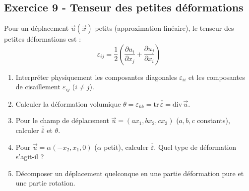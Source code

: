 \documentclass[12pt,a4paper]{article}
\begin{document}
\subsection*{Exercice 9 - Tenseur des petites déformations \niveau{\moyen}}

\begin{boiteexercice}
Pour un déplacement $\vec{u}(\vec{x})$ petits (approximation linéaire), le tenseur des petites déformations est :
\[
\varepsilon_{ij} = \frac{1}{2}\left(\frac{\partial u_i}{\partial x_j} + \frac{\partial u_j}{\partial x_i}\right)
\]
\begin{enumerate}
  \item Interpréter physiquement les composantes diagonales $\varepsilon_{ii}$ et les composantes de cisaillement $\varepsilon_{ij}$ ($i\neq j$).
  \item Calculer la déformation volumique $\theta = \varepsilon_{kk} = \text{tr}\,\overline{\overline{\varepsilon}} = \text{div}\,\vec{u}$.
  \item Pour le champ de déplacement $\vec{u} = (ax_1, bx_2, cx_3)$ ($a,b,c$ constants), calculer $\overline{\overline{\varepsilon}}$ et $\theta$.
  \item Pour $\vec{u} = \alpha(-x_2, x_1, 0)$ ($\alpha$ petit), calculer $\overline{\overline{\varepsilon}}$. Quel type de déformation s'agit-il ?
  \item Décomposer un déplacement quelconque en une partie déformation pure et une partie rotation.
\end{enumerate}
\end{boiteexercice}
\end{document}
